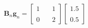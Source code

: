 \documentclass[preview]{standalone}
\begin{document}
\begin{align*}
\mathbf{B}_n \mathbf{g}_n = \begin{bmatrix} 1 & \quad 1 \\ \\0 & \quad 2 \end{bmatrix}\begin{bmatrix} 1.5 \\ \\ 0.5 \end{bmatrix}
\end{align*}
\end{document}
